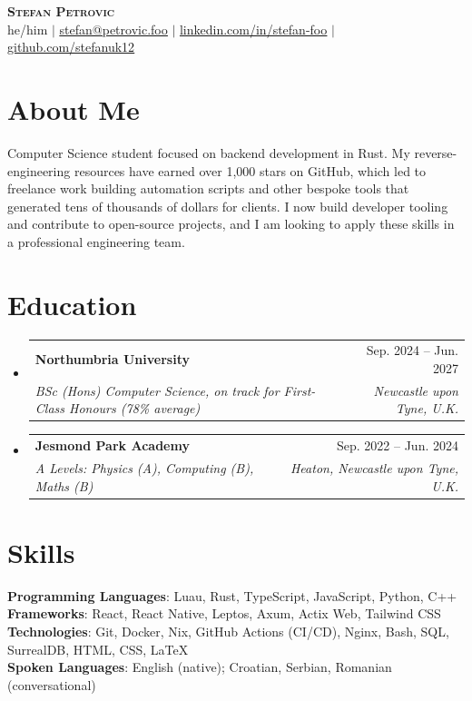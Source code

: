 \documentclass[a4paper,11pt]{article}
\makeatletter
\newcommand{\resumeSubheading}[4]{
  \vspace{-2pt}\item
    \begin{tabular*}{0.97\textwidth}[t]{l@{\extracolsep{\fill}}r}
      \textbf{#1} & #2 \\
      \textit{\small#3} & \textit{\small #4} \\
    \end{tabular*}\vspace{-7pt}
}
\newcommand{\resumeSubHeadingListStart}{\begin{itemize}[leftmargin=0.15in, label={}]}
\newcommand{\resumeSubHeadingListEnd}{\end{itemize}}
\makeatother
\begin{document}
\begin{center}
    \textbf{\Huge \scshape Stefan Petrovic} \\ \vspace{1pt}
    \small he/him $|$
    \href{mailto:stefan@petrovic.foo}{\underline{stefan@petrovic.foo}} $|$
    \href{https://linkedin.com/in/stefan-foo}{\underline{linkedin.com/in/stefan-foo}} $|$
    \href{https://github.com/Stefanuk12}{\underline{github.com/stefanuk12}}
\end{center}


\section{About Me}
{\small
Computer Science student focused on backend development in Rust. My reverse-engineering resources have earned over 1,000 stars on GitHub, which led to freelance work building automation scripts and other bespoke tools that generated tens of thousands of dollars for clients. I now build developer tooling and contribute to open-source projects, and I am looking to apply these skills in a professional engineering team.\par
}


\section{Education}
  \resumeSubHeadingListStart
    \resumeSubheading
      {Northumbria University}{Sep. 2024 -- Jun. 2027}
      {BSc (Hons) Computer Science, on track for First-Class Honours (78\% average)}{Newcastle upon Tyne, U.K.}
    \resumeSubheading
      {Jesmond Park Academy}{Sep. 2022 -- Jun. 2024}
      {A Levels: Physics (A), Computing (B), Maths (B)}{Heaton, Newcastle upon Tyne, U.K.}
  \resumeSubHeadingListEnd


\section{Skills}
 \begin{itemize}[leftmargin=0.15in, label={}]
    \small{\item{
     \textbf{Programming Languages}{: Luau, Rust, TypeScript, JavaScript, Python, C++} \\
     \textbf{Frameworks}{: React, React Native, Leptos, Axum, Actix Web, Tailwind CSS} \\
     \textbf{Technologies}{: Git, Docker, Nix, GitHub Actions (CI/CD), Nginx, Bash, SQL, SurrealDB, HTML, CSS, LaTeX} \\
     \textbf{Spoken Languages}{: English (native); Croatian, Serbian, Romanian (conversational)}
    }}
 \end{itemize}
\end{document}
